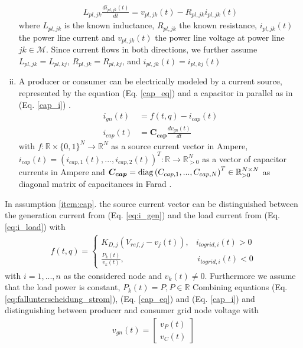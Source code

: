\begin{enumerate}[i.]
\begin{align}
        L_{pl,jk} \frac{di_{pl,jk}(t)}{dt} = v_{pl,jk}(t)-R_{pl,jk}i_{pl,jk}(t) \label{eq:induct}
    \end{align} where $L_{pl,jk}$ is the known inductance, $R_{pl,jk}$ the known resistance, $i_{pl,jk}(t)$ the power line current and $v_{pl,jk}(t)$ the power line voltage at power line $jk \in \mathcal{M}$. Since current flows in both directions, we further assume $L_{pl,jk} = L_{pl,kj}$, $R_{pl,jk} = R_{pl,kj}$, and $i_{pl,jk}(t) = i_{pl,kj}(t)$
    \item \label{item:cap} A producer or consumer can be electrically modeled by a current source, represented by the equation (Eq. \ref{cap_eq}) and a capacitor in parallel as in (Eq. \ref{cap_i}) \cite{lia_master}. 
    \begin{align}
        i_{gn}(t) &= f(t,q) - i_{cap}(t) \label{cap_eq}\\
        i_{cap}(t) &= \boldsymbol{C_{cap}}\frac{dv_{gn}(t)}{dt} \label{cap_i}
    \end{align}
    with $f: \mathbb{R}\times \{0,1\}^N \rightarrow \mathbb{R}^N$ as a source current vector in Ampere, $i_{cap}(t) = (i_{cap,1}(t),...,i_{cap,2}(t))^T: \mathbb{R} \rightarrow \mathbb{R}^N_{>0}$ as a vector of capacitor currents in Ampere and $\boldsymbol{C_{cap}} = \operatorname{diag}{(C_{cap,1},...,C_{cap,N})}^T \in \mathbb{R}^{N \times N}_{>0}$ as diagonal matrix of capacitances in Farad \cite{lia_master}.
\end{enumerate}
In assumption \ref{item:cap}. the source current vector can be distinguished between the generation current from (Eq. \ref{eq:i_gen}) and the load current from (Eq. \ref{eq:i_load}) with 
\begin{align}
    f(t,q) =\begin{cases}
K_{D,j}(V_{ref,j} - v_j(t)),& i_{to grid,i}(t) >0\\
\frac{P_k(t)}{v_k(t)}, & \, i_{to grid,i}(t) <0
\end{cases} \label{eq:fallunterscheidung_strom}
\end{align}
with $i = 1,...,n$ as the considered node and $v_k(t) \neq 0$. Furthermore we assume that the load power is constant, $P_k(t) = P, P \in \mathbb{R}$ Combining equations (Eq. \ref{eq:fallunterscheidung_strom}), (Eq. \ref{cap_eq}) and (Eq. \ref{cap_i}) and distinguishing between producer and consumer grid node voltage with 
\begin{align}
    v_{gn}(t) = \left[\begin{array}{c} v_P(t) \\ v_C(t) \end{array}\right] 
\end{align}
